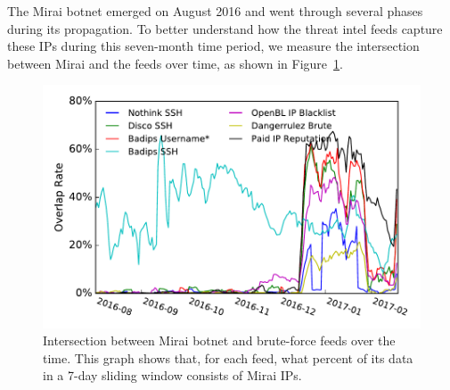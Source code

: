 The Mirai botnet emerged on August 2016 and went through several
phases during its propagation. To better understand how the threat
intel feeds capture these IPs during this seven-month time period, we
measure the intersection between Mirai and the feeds over time, as
shown in Figure~\ref{fig:mirai_brute_daily_overlap}.



\begin{figure}
\includegraphics[width=0.95\linewidth]{images/mirai_brute_daily_overlap.pdf}
\caption{Intersection between Mirai botnet and brute-force feeds over the time.
This graph shows that, for each feed, what percent of its data in a 7-day
sliding window consists of Mirai IPs.}
\label{fig:mirai_brute_daily_overlap}
\end{figure}


